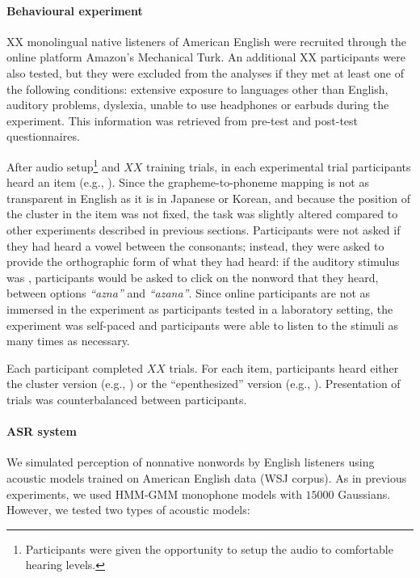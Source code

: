 \paragraph{Behavioural experiment}
{\color{red}XX} monolingual native listeners of American English were recruited through the online platform Amazon's Mechanical Turk. An additional {\color{red}XX participants were also tested, but they were excluded from the analyses if they met at least one of the following conditions: extensive exposure to languages other than English, auditory problems, dyslexia, unable to use headphones or earbuds during the experiment}. This information was retrieved from pre-test and post-test questionnaires.

After audio setup\footnote{Participants were given the opportunity to setup the audio to comfortable hearing levels.} and {\color{red}$XX$} training trials, in each experimental trial participants heard an item (e.g., ). Since the grapheme-to-phoneme mapping is not as transparent in English as it is in Japanese or Korean, and because the position of the cluster in the item was not fixed, the task was slightly altered compared to other experiments described in previous sections. Participants were not asked if they had heard a vowel between the consonants; instead, they were asked to provide the orthographic form of what they had heard: if the auditory stimulus was , participants would be asked to click on the nonword that they heard, between options \textit{``azna''} and  \textit{``azana''}. Since online participants are not as immersed in the experiment as participants tested in a laboratory setting, the experiment was self-paced and participants were able to listen to the stimuli as many times as necessary.

Each participant completed {\color{red}$XX$} trials. For each item, participants heard either the cluster version (e.g., ) or the ``epenthesized'' version (e.g., ). Presentation of trials was counterbalanced between participants.   


\paragraph{ASR system}
We simulated perception of nonnative nonwords by English listeners using acoustic models trained on American English data (WSJ corpus). As in previous experiments, we used HMM-GMM monophone models with $15000$ Gaussians. However, we tested two types of acoustic models:

